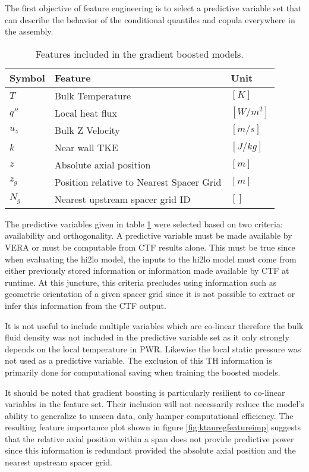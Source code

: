 The first objective of feature engineering is to select a predictive variable set that can describe the behavior of the conditional quantiles and copula everywhere in the assembly.
   
\begin{table}[h]
    \begin{center}
    \caption[Included features.]{Features included in the gradient boosted models.}
\begin{tabular}[h]{|l | l | l |}
    \hline
    Symbol & Feature & Unit \\
    \hline
    $T$ & Bulk Temperature  &  $[K]$ \\
    $q''$ & Local heat flux & $[W/m^2]$ \\
    $u_z$ & Bulk Z Velocity &  $[m/s]$ \\
    $k$ & Near wall TKE &  $[J/kg]$ \\
    $z$ & Absolute axial position & $[m]$ \\
    $z_g$ & Position relative to Nearest Spacer Grid & $[m]$ \\
    $N_g$ & Nearest upstream spacer grid ID & $[]$ \\
    \hline
\end{tabular}
\label{tab:features}
\end{center}
\end{table}

The predictive variables given in table \ref{tab:features} were selected based on two criteria:  availability and orthogonality.  A predictive variable must be made available by VERA or must be computable from CTF results alone.  This must be true since when evaluating the hi2lo model, the inputs to the hi2lo model must come from either previously stored information or information made available by CTF at runtime.  At this juncture, this criteria precludes using information such as geometric orientation of a given spacer grid since it is not possible to extract or infer this information from the CTF output.

It is not useful to include multiple variables which are co-linear therefore the bulk fluid density was not included in the predictive variable set as it only strongly depends on the local temperature in PWR. Likewise the local static pressure was not used as a predictive variable.  The exclusion of this TH information is primarily done for computational saving when training the boosted models.  

It should be noted that gradient boosting is particularly resilient to co-linear variables in the feature set.  Their inclusion will not necessarily reduce the model's ability to generalize to unseen data, only hamper computational efficiency.  The resulting feature importance plot shown in figure \ref{fig:ktauregfeatureimp} suggests that the relative axial position within a span does not provide predictive power since this information is redundant provided the absolute axial position and the nearest upstream spacer grid.  

